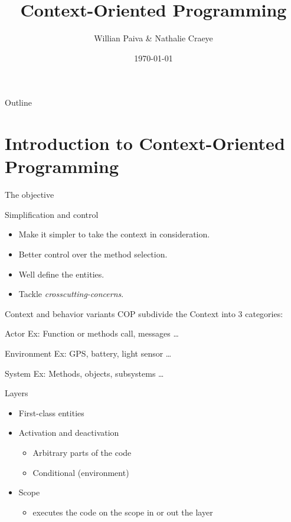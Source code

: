 \documentclass[presentation]{beamer}
\author{Willian Paiva \& Nathalie Craeye}
\date{\today}
\title{Context-Oriented Programming}
\begin{document}
\maketitle
\begin{frame}{Outline}
\tableofcontents
\end{frame}


\section{Introduction to Context-Oriented Programming}
\label{sec:orgeb820d5}

\begin{frame}[label={sec:org73a6eee}]{The objective}
\begin{block}{Simplification and control}
\begin{itemize}
\item Make it simpler to take the context in consideration.
\item Better control over the method selection.
\item Well define the entities.
\item Tackle \emph{crosscutting-concerns}.
\end{itemize}
\end{block}
\end{frame}



\begin{frame}[label={sec:org7e750ad}]{Context and behavior variants}
COP subdivide the Context into 3 categories:
\begin{block}{Actor}
Ex: Function or methods call, messages \ldots{}
\end{block}
\begin{block}{Environment}
Ex: GPS, battery, light sensor \ldots{} 
\end{block}
\begin{block}{System}
Ex: Methods, objects, subsystems \ldots{}
\end{block}
\end{frame}

\begin{frame}[label={sec:org0b26612}]{Layers}
\begin{itemize}
\item First-class entities
\item Activation and deactivation
\begin{itemize}
\item Arbitrary parts of the code
\item Conditional (environment)
\end{itemize}
\item Scope
\begin{itemize}
\item executes the code on the scope in or out the layer
\end{itemize}
\end{itemize}
\end{frame}
\end{document}
